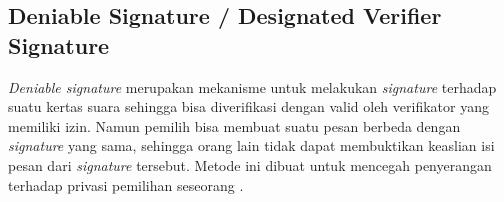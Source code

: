 \subsection{Deniable Signature / Designated Verifier Signature}

\textit{Deniable signature} merupakan mekanisme untuk melakukan \textit{signature} terhadap suatu kertas suara sehingga bisa diverifikasi dengan valid oleh verifikator yang memiliki izin. Namun pemilih bisa membuat suatu pesan berbeda dengan \textit{signature} yang sama, sehingga orang lain tidak dapat membuktikan keaslian isi pesan dari \textit{signature} tersebut. Metode ini dibuat untuk mencegah penyerangan terhadap privasi pemilihan seseorang \cite{deniable}.